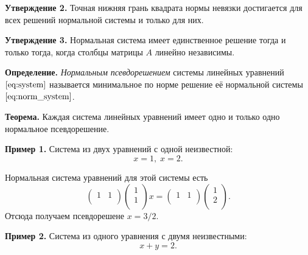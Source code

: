 \documentclass[11pt,a4paper]{article}
\begin{document}
\textbf{Утверждение 2.} Точная нижняя грань квадрата нормы невязки
достигается для всех решений нормальной системы и только для них.

\textbf{Утверждение 3.} Нормальная система имеет единственное решение
тогда и только тогда, когда столбцы матрицы \(A\) линейно независимы.


\textbf{Определение.} \emph{Нормальным псевдорешением} системы линейных уравнений \(\eqref{eq:system}\) называется минимальное по норме решение её нормальной системы \(\eqref{eq:norm_system}\).

\textbf{Теорема.} Каждая система линейных уравнений имеет одно и только одно нормальное псевдорешение.


\textbf{Пример 1.} Система из двух уравнений с одной неизвестной:
\[ x=1, \; x=2. \]

Нормальная система уравнений для этой системы есть \[
  \begin{pmatrix}
    1 & 1 \\
  \end{pmatrix}
  \begin{pmatrix}
    1 \\
    1 \\
  \end{pmatrix}
  x =
  \begin{pmatrix}
    1 & 1 \\
  \end{pmatrix}
  \begin{pmatrix}
    1 \\
    2 \\
  \end{pmatrix}.
\] Отсюда получаем псевдорешене \(x = 3/2\).

    \textbf{Пример 2.} Система из одного уравнения с двумя неизвестными:
\[ x + y = 2. \]
\end{document}
